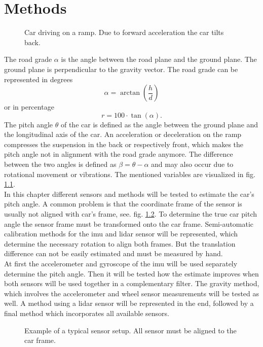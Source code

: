 \chapter{Methods}
\label{ch:Methods}
\begin{figure}[htpb]
    \centering
    
    \caption{Car driving on a ramp. Due to forward acceleration the car tilts back.}
    \label{fig:tikz_car_tilt}
\end{figure}
The road grade $\alpha$ is the angle between the road plane and the ground plane.
The ground plane is perpendicular to the gravity vector.
The road grade can be represented in degrees
\begin{equation}
    \alpha = \arctan(\frac{h}{d})
\end{equation}
or in percentage
\begin{equation}
    r = 100\cdot\tan(\alpha).
\end{equation}
The pitch angle $\theta$ of the car is defined as the angle between the ground plane and the longitudinal axis of the car.
An acceleration or deceleration on the ramp compresses the suspension in the back or respectively front, which makes the pitch angle not in alignment with the road grade anymore.
The difference between the two angles is defined as $\beta = \theta - \alpha$ and may also occur due to rotational movement or vibrations.
The mentioned variables are visualized in fig. \ref{fig:tikz_car_tilt}.\\
In this chapter different sensors and methods will be tested to estimate the car's pitch angle.
A common problem is that the coordinate frame of the sensor is usually not aligned with car's frame, see. fig. \ref{fig:tikz_car_frames}.
To determine the true car pitch angle the sensor frame must be transformed onto the car frame.
Semi-automatic calibration methods for the \gls{imu} and \gls{lidar} sensor will be represented, which determine the necessary rotation to align both frames.
But the translation difference can not be easily estimated and must be measured by hand.\\
At first the accelerometer and gyroscope of the \gls{imu} will be used separately determine the pitch angle.
Then it will be tested how the estimate improves when both sensors will be used together in a complementary filter.
The gravity method, which involves the accelerometer and wheel sensor measurements will be tested as well.
A method using a \gls{lidar} sensor will be represented in the end, followed by a final method which incorporates all available sensors.
\begin{figure}[htpb]
    \centering
    
    \caption{Example of a typical sensor setup. All sensor must be aligned to the car frame.}
    \label{fig:tikz_car_frames}
\end{figure}



